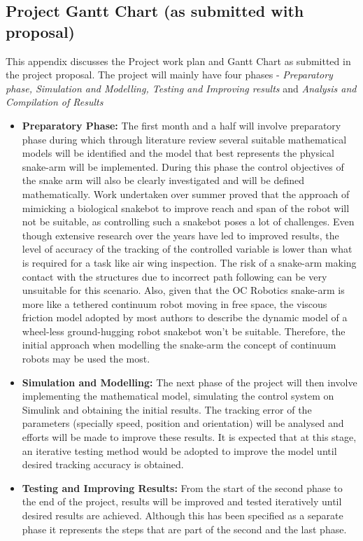 \documentclass[a4paper,12pt]{report}
\begin{document}
\begin{appendices}
	\chapter{Project Gantt Chart {\normalsize (as submitted with proposal)}}
	This appendix discusses the Project work plan and Gantt Chart as submitted in the project proposal.
	The project will mainly have four phases - \textit{Preparatory phase, Simulation and Modelling, Testing and Improving results} and \textit{Analysis and Compilation of Results}
	\begin{itemize}
		\item \textbf{Preparatory Phase:} The first month and a half will involve preparatory phase during which through literature review several suitable mathematical models will be identified and the model that best represents the physical snake-arm will be implemented. During this phase the control objectives of the snake arm will also be clearly investigated and will be defined mathematically.
		Work undertaken over summer proved that the approach of mimicking a biological snakebot to improve reach and span of the robot will not be suitable, as controlling such a snakebot poses a lot of challenges. Even though extensive research over the years have led to improved results, the level of accuracy of the tracking of the controlled variable is lower than what is required for a task like air wing inspection. The risk of a snake-arm making contact with the structures due to incorrect path following can be very unsuitable for this scenario. Also, given that the OC Robotics snake-arm is more like a tethered continuum robot moving in free space, the viscous friction model adopted by most authors to describe the dynamic model of a wheel-less ground-hugging robot snakebot won’t be suitable. Therefore, the initial approach when modelling the snake-arm the concept of continuum robots may be used the most.
		\item \textbf{Simulation and Modelling:} The next phase of the project will then involve implementing the mathematical model, simulating the control system on Simulink and obtaining the initial results. The tracking error of the parameters (specially speed, position and orientation) will be analysed and efforts will be made to improve these results. It is expected that at this stage, an iterative testing method would be adopted to improve the model until desired tracking accuracy is obtained.
		\item \textbf{Testing and Improving Results:} From the start of the second phase to the end of the project, results will be improved and tested iteratively until desired results are achieved. Although this has been specified as a separate phase it represents the steps that are part of the second and the last phase. 

\end{itemize}
\end{appendices}
\end{document}
